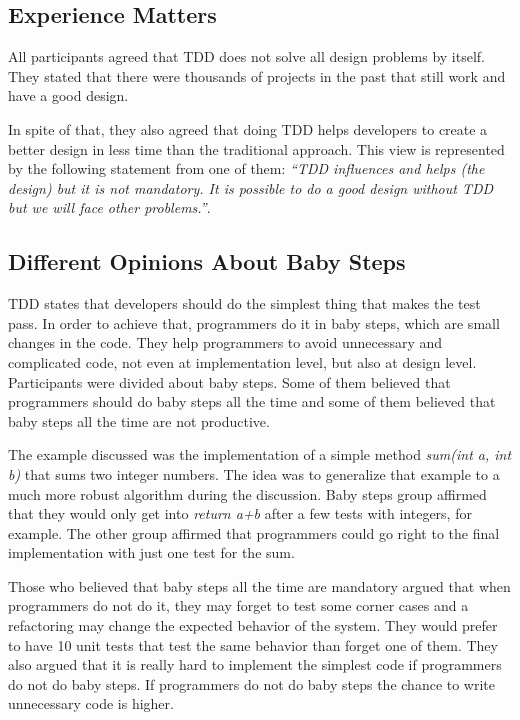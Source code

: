 \subsection{Experience Matters}
\label{subsec:experience}

All participants agreed that TDD does not solve all design problems by itself.
They stated that there were thousands of projects in the past that still work
and have a good design. 

In spite of that, they also agreed that doing TDD helps
developers to create a better design in less time than the traditional approach.
This view is represented by the following statement from one of them:
\textit{``TDD influences and helps (the design) but it is not mandatory. It is
possible to do a good design without TDD but we will face other problems.''}.

\subsection{Different Opinions About Baby Steps}

TDD states that developers should do the simplest thing that
makes the test pass. In order to achieve that, programmers do it in baby steps,
which are small changes in the code. They help programmers to avoid
unnecessary and complicated code, not even at implementation level, but also at
design level.
Participants were divided about baby steps. Some of them believed that
programmers should do baby steps all the time and some of them believed that
baby steps all the time are not productive.

The example discussed was the implementation of a simple method
\textit{sum(int a, int b)} that sums two integer numbers. The idea was to
generalize that example to a much more robust algorithm during the discussion.
Baby steps group affirmed that they would only get into \textit{return a+b}
after a few tests with integers, for example. The other group affirmed that
programmers could go right to the final implementation with just one test for
the sum.

Those who believed that baby steps all the time are mandatory argued that when
programmers do not do it, they may forget to test some corner cases and a
refactoring may change the expected behavior of the system.
They would prefer to have 10 unit tests that test the same behavior than forget
one of them.
They also argued that it is really hard to implement the simplest code if
programmers do not do baby steps. If programmers do not do baby steps the chance
to write unnecessary code is higher.

